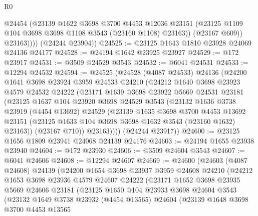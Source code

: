 \begin{lexlean}{R0}
\begin{coremodule}
                @24454
                (@23139
                  @1622
                  @3698
                  @3700
                  @4453
                  @12036
                  @23151
                  (@23125 @1109 @104 @3698 @3698 @1108 @3543 (@23160 @1108) @23163))
                (@23167 @609))
              @23163))))
      (@24244 @23904))
@24525 := @23125 @1643 @1810 @23928 @24069 @24136 @24177
@24528 := @24194 @1642 @23925 @23927
@24529 := @172 @23917
@24531 := @3509 @24529 @3543
@24532 := @6041 @24531
@24533 := @12294 @24532
@24594 := @24525
    (@24528
      (@4087 @24533)
      @24136
      (@24200
        @1641
        @3698
        @23924
        @3959
        @24533
        @24210
        (@24212
          @1640
          @3698
          @23923
          @4579
          @24532
          @24222
          (@23171
            @1639
            @3698
            @23922
            @5669
            @24531
            @23181
            (@23125
              @1637
              @104
              @23920
              @3698
              @24529
              @3543
              (@23132
                @1636
                @3738
                @23919
                (@4454 @13692)
                @24529
                (@23139
                  @1635
                  @3698
                  @3700
                  @4453
                  @13692
                  @23151
                  (@23125 @1633 @104 @3698 @3698 @1632 @3543 (@23160 @1632) @23163))
                (@23167 @710))
              @23163))))
      (@24244 @23917))
@24600 := @23125 @1656 @1809 @23941 @24068 @24139 @24176
@24603 := @24194 @1655 @23938 @23940
@24604 := @172 @23930
@24606 := @3509 @24604 @3543
@24607 := @6041 @24606
@24608 := @12294 @24607
@24669 := @24600
    (@24603
      (@4087 @24608)
      @24139
      (@24200
        @1654
        @3698
        @23937
        @3959
        @24608
        @24210
        (@24212
          @1653
          @3698
          @23936
          @4579
          @24607
          @24222
          (@23171
            @1652
            @3698
            @23935
            @5669
            @24606
            @23181
            (@23125
              @1650
              @104
              @23933
              @3698
              @24604
              @3543
              (@23132
                @1649
                @3738
                @23932
                (@4454 @13565)
                @24604
                (@23139
                  @1648
                  @3698
                  @3700
                  @4453
                  @13565

\end{coremodule}
\end{lexlean}
